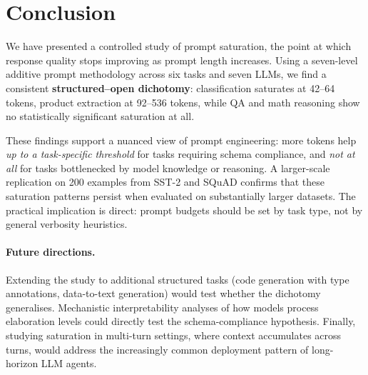 \section{Conclusion}
\label{sec:conclusion}

We have presented a controlled study of prompt saturation, the point at which
response quality stops improving as prompt length increases.
Using a seven-level additive prompt methodology across six tasks and seven LLMs,
we find a consistent \textbf{structured--open dichotomy}: classification
saturates at 42--64 tokens, product extraction at 92--536 tokens, while QA and
math reasoning show no statistically significant saturation at all.

These findings support a nuanced view of prompt engineering: more tokens help
\emph{up to a task-specific threshold} for tasks requiring schema compliance,
and \emph{not at all} for tasks bottlenecked by model knowledge or reasoning.
A larger-scale replication on 200 examples from SST-2 and SQuAD confirms that
these saturation patterns persist when evaluated on substantially larger
datasets.
The practical implication is direct: prompt budgets should be set by task
type, not by general verbosity heuristics.

\paragraph{Future directions.}
Extending the study to additional structured tasks (code generation with type
annotations, data-to-text generation) would test whether the dichotomy
generalises.
Mechanistic interpretability analyses of how models process elaboration levels
could directly test the schema-compliance hypothesis.
Finally, studying saturation in multi-turn settings, where context accumulates
across turns, would address the increasingly common deployment pattern of
long-horizon LLM agents.

